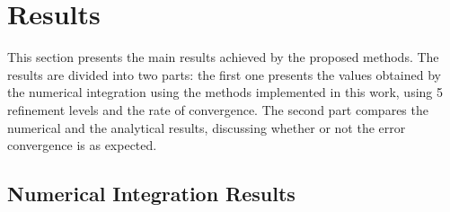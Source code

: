 \section{Results} \label{sec:results}
This section presents the main results achieved by the proposed methods. The results are divided into two parts: the first one presents the values obtained by the numerical integration using the methods implemented in this work, using 5 refinement levels and the rate of convergence. The second part compares the numerical and the analytical results, discussing whether or not the error convergence is as expected. 



\subsection{Numerical Integration Results}
